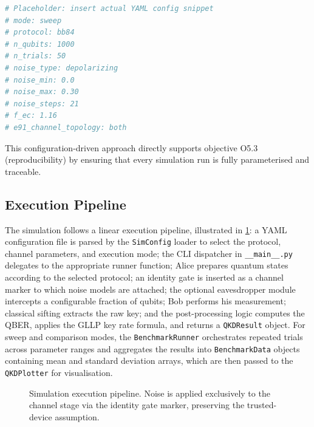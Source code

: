 \documentclass[10pt, a4paper]{report}
\begin{document}
\begin{lstlisting}[language=Python, caption={Example YAML configuration for a BB84 noise sweep}, label={lst:yaml-config}]
# Placeholder: insert actual YAML config snippet
# mode: sweep
# protocol: bb84
# n_qubits: 1000
# n_trials: 50
# noise_type: depolarizing
# noise_min: 0.0
# noise_max: 0.30
# noise_steps: 21
# f_ec: 1.16
# e91_channel_topology: both
\end{lstlisting}

This configuration-driven approach directly supports objective O5.3 (reproducibility) by ensuring that every simulation run is fully parameterised and traceable.

\subsection{Execution Pipeline}

The simulation follows a linear execution pipeline, illustrated in \cref{fig:pipeline}: a YAML configuration file is parsed by the \texttt{SimConfig} loader to select the protocol, channel parameters, and execution mode; the CLI dispatcher in \texttt{\_\_main\_\_.py} delegates to the appropriate runner function; Alice prepares quantum states according to the selected protocol; an identity gate is inserted as a channel marker to which noise models are attached; the optional eavesdropper module intercepts a configurable fraction of qubits; Bob performs his measurement; classical sifting extracts the raw key; and the post-processing logic computes the QBER, applies the GLLP key rate formula, and returns a \texttt{QKDResult} object. For sweep and comparison modes, the \texttt{BenchmarkRunner} orchestrates repeated trials across parameter ranges and aggregates the results into \texttt{BenchmarkData} objects containing mean and standard deviation arrays, which are then passed to the \texttt{QKDPlotter} for visualisation.

\begin{figure}[ht]
    \centering
    \caption{Simulation execution pipeline. Noise is applied exclusively to the channel stage via the identity gate marker, preserving the trusted-device assumption.}
    \label{fig:pipeline}
\end{figure}
\end{document}
